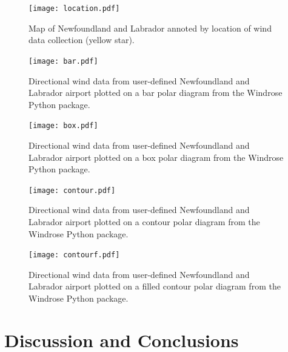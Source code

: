 \documentclass{article}
\begin{document}
\begin{figure}[h!]                                                                                                                                                                                                 
\centering                                                                                                                                                                                                         
\texttt{[image: location.pdf]}                                                                                                                                                                                                
\caption{Map of Newfoundland and Labrador annoted by location of wind data collection (yellow star).}
\label{location}                                                                                                              
\end{figure} 
  
\begin{figure}[h!]
\centering
\texttt{[image: bar.pdf]}
\caption{Directional wind data from user-defined Newfoundland and Labrador airport plotted on a bar polar diagram from the Windrose Python package.}
\label{bar_windrose}
\end{figure}

\begin{figure}[h!]
\centering
\texttt{[image: box.pdf]}
\caption{Directional wind data from user-defined Newfoundland and Labrador airport plotted on a box polar diagram from the Windrose Python package.}
\label{box}
\end{figure}

\begin{figure}[h!]
\centering
\texttt{[image: contour.pdf]}
\caption{Directional wind data from user-defined Newfoundland and Labrador airport plotted on a contour polar diagram from the Windrose Python package.}
\label{contour_windrose}
\end{figure}

\begin{figure}[h!]
\centering
\texttt{[image: contourf.pdf]}
\caption{Directional wind data from user-defined Newfoundland and Labrador airport plotted on a filled contour polar diagram from the Windrose Python package.}
\label{contourf_windrose}
\end{figure}

\section{Discussion and Conclusions}\label{Discussion_and_conclusions}
\end{document}
